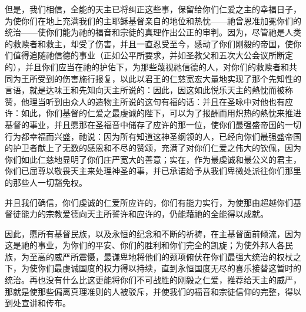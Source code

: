 但是，我们相信，全能的天主已将纠正这些事，保留给你们仁爱之主的幸福日子，为使你们在地上充满我们的主耶稣基督亲自的地位和热忱——祂曾恩准加冕你们的统治——使你们能为祂的福音和宗徒的真理作出公正的审判。因为，尽管祂是人类的救赎者和救主，却受了伤害，并且一直忍受至今，感动了你们刚毅的帝国，使你们值得追随祂信德的事业（正如公平所要求，并如圣教父和五次大公会议所断定的），并且你们应当在祂的护佑下，为那些蔑视祂信德的人，对你们的救赎者和共同为王所受到的伤害施行报复，以此以君王的仁慈宽宏大量地实现了那个先知性的言语，就是达味王和先知向天主所说的：因此，因这如此悦乐天主的熱忱而被称赞，他理当听到由众人的造物主所说的这句有福的话：并且在圣咏中对他也有应许：如此，你们基督的仁爱之最虔诚的陛下，可以为了报酬而用炽热的熱忱来推进基督的事业，并且愿那在圣福音中储存了应许的那一位，使你们最强盛帝国的一切行为都幸福而兴盛，祂说：因为所有知道这神圣纲领的人，已经向你们最强盛帝国的护卫者献上了无数的感恩和不尽的赞颂，充满了对你们仁爱之伟大的钦佩，因为你们如此仁慈地显明了你们庄严宽大的善意；实在，作为最虔诚和最公义的君主，你们已屈尊以敬畏天主来处理神圣的事，并已承诺给予从我们卑微处派往你们那里的那些人一切豁免权。\par

并且我们确信，你们虔诚的仁爱所应许的，你们有能力实行，为使那由超越你们基督徒能力的宗教爱德向天主所誓许和应许的，仍能藉祂的全能得以成就。\par

因此，愿所有基督民族，以及永恒的纪念和不断的祈祷，在主基督面前倾流，因为这是祂的事业，为你们的平安、你们的胜利和你们完全的凯旋；为使外邦人各民族，为至高的威严所震慑，最谦卑地将他们的颈项俯伏在你们最强大统治的权杖之下，为使你们最虔诚国度的权力得以持续，直到永恒国度无尽的喜乐接替这暂时的统治。再也没有什么比这更能将你们不可战胜的刚毅之仁爱，推荐给天主的威严，那就是使那些偏离真理准则的人被驳斥，并使我们的福音和宗徒信仰的完整，得以到处宣讲和传布。\par

